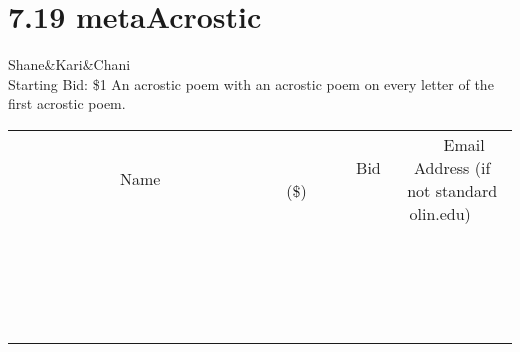 \documentclass[11pt]{article}
\begin{document}
\section*{7.19 metaAcrostic}
Shane\&Kari\&Chani
\\
Starting Bid: \$1
\newline
An acrostic poem with an acrostic poem on every letter of the first acrostic poem.
\\[3ex]
\begin{tabular}{c c c}
~~~~~~~~~~~~~Name~~~~~~~~~~~~~ & ~~~~~~~~~Bid (\$)~~~~~~~~~  & ~~~Email Address (if not standard olin.edu)~~~\\
 & & \\
\hline
 & & \\
\hline
 & & \\
\hline
 & & \\
\hline
 & & \\
\hline
 & & \\
\hline
 & & \\
\hline
 & & \\
\hline
 & & \\
\hline
 & & \\
\hline
 & & \\
\hline
 & & \\
\hline
 & & \\
\hline
 & & \\
\hline
 & & \\
\hline
 & & \\
\hline
 & & \\
\hline
 & & \\
\hline
 & & \\
\hline
\end{tabular}
\newpage
\end{document}
